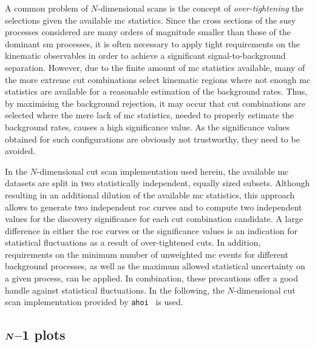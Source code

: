A common problem of $N$-dimensional scans is the concept of \textit{over-tightening} the selections given the available \gls{mc} statistics.
Since the cross sections of the \gls{susy} processes considered are many orders of magnitude smaller than those of the dominant \gls{sm} processes, it is often necessary to apply tight requirements on the kinematic observables in order to achieve a significant signal-to-background separation.
However, due to the finite amount of \gls{mc} statistics available, many of the more extreme cut combinations select kinematic regions where not enough \gls{mc} statistics are available for a reasonable estimation of the background rates.
Thus, by maximising the background rejection, it may occur that cut combinations are selected where the mere lack of \gls{mc} statistics, needed to properly estimate the background rates, causes a high significance value.
As the significance values obtained for such configurations are obviously not trustworthy, they need to be avoided. 

In the $N$-dimensional cut scan implementation used herein, the available \gls{mc} datasets are split in two statistically independent, equally sized subsets. Although resulting in an additional dilution of the available \gls{mc} statistics, this approach allows to generate two independent \gls{roc} curves and  to compute two independent values for the discovery significance for each cut combination candidate. A large difference in either the \gls{roc} curves or the significance values is an indication for statistical fluctuations as a result of over-tightened cuts. In addition, requirements on the minimum number of unweighted \gls{mc} events for different background processes, as well as the maximum allowed statistical uncertainty on a given process, can be applied. In combination, these precautions offer a good handle against statistical fluctuations. In the following, the $N$-dimensional cut scan implementation provided by \texttt{ahoi}~\cite{ahoi} is used.

\subsection[\textit{N}--1 plots]{$\makemebold{N}$--1 plots}\label{sec:n-1-scan}

